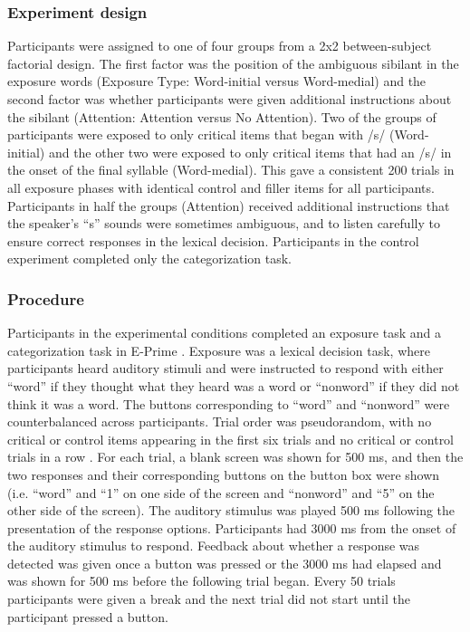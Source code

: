 \subsubsection{Experiment design}

Participants were assigned to one of four groups from a 2x2 between-subject factorial design.
The first factor was the position of the ambiguous sibilant in the exposure words (Exposure Type: Word-initial versus Word-medial) and the second factor was whether participants were given additional instructions about the sibilant (Attention: Attention versus No Attention).
Two of the groups of participants were exposed to only critical items that began with /s/ (Word-initial) and the other two were exposed to only critical items that had an /s/ in the onset of the final syllable (Word-medial).
This gave a consistent 200 trials in all exposure phases with identical control and filler items for all participants. 
Participants in half the groups (Attention) received additional instructions that the speaker's ``s'' sounds were sometimes ambiguous, and to listen carefully to ensure correct responses in the lexical decision.
Participants in the control experiment completed only the categorization task.

\subsubsection{Procedure}

Participants in the experimental conditions completed an exposure task and a categorization task in E-Prime \citep{PsychologySoftwareTools2012}.  
Exposure was a lexical decision task, where participants heard auditory stimuli and were instructed to respond with either ``word'' if they thought what they heard was a word or ``nonword'' if they did not think it was a word.  
The buttons corresponding to ``word'' and ``nonword'' were counterbalanced across participants. Trial order was pseudorandom, with no critical or control items appearing in the first six trials and no critical or control trials in a row \citep[following][]{Reinisch2013}.
For each trial, a blank screen was shown for 500 ms, and then the two responses and their corresponding buttons on the button box were shown (i.e. ``word'' and ``1'' on one side of the screen and ``nonword'' and ``5'' on the other side of the screen).
The auditory stimulus was played 500 ms following the presentation of the response options.
Participants had 3000 ms from the onset of the auditory stimulus to respond.
Feedback about whether a response was detected was given once a button was pressed or the 3000 ms had elapsed and was shown for 500 ms before the following trial began.
Every 50 trials participants were given a break and the next trial did not start until the participant pressed a button.

